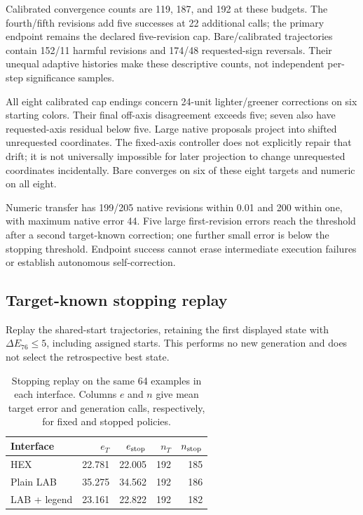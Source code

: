 Calibrated convergence counts are 119, 187, and 192 at these budgets.
The fourth/fifth revisions add five successes at 22 additional calls;
the primary endpoint remains the declared five-revision cap.
Bare/calibrated trajectories contain 152/11 harmful revisions and 174/48
requested-sign reversals. Their unequal adaptive histories make these
descriptive counts, not independent per-step significance samples.

All eight calibrated cap endings concern 24-unit lighter/greener corrections
on six starting colors. Their final off-axis disagreement exceeds five;
seven also have requested-axis residual below five. Large native proposals
project into shifted unrequested coordinates. The fixed-axis controller
does not explicitly repair that drift; it is not universally impossible
for later projection to change unrequested coordinates incidentally.
Bare converges on six of these eight targets and numeric on all eight.

Numeric transfer has 199/205 native revisions within 0.01 and 200 within one,
with maximum native error 44. Five large first-revision errors reach the
threshold after a second target-known correction; one further small error
is below the stopping threshold. Endpoint success cannot erase intermediate
execution failures or establish autonomous self-correction.

\subsection{Target-known stopping replay}
\label{app:stopping}
Replay the shared-start trajectories, retaining the first displayed state
with $\Delta E_{76}\leq5$, including assigned starts. This performs no
new generation and does not select the retrospective best state.

\begin{table}[H]
\centering\small
\begin{tabular}{@{}lrrrr@{}}
\toprule
Interface & $e_T$ & $e_{\rm stop}$ & $n_T$ & $n_{\rm stop}$ \\
\midrule
HEX & 22.781 & 22.005 & 192 & 185 \\
Plain LAB & 35.275 & 34.562 & 192 & 186 \\
LAB + legend & 23.161 & 22.822 & 192 & 182 \\
\bottomrule
\end{tabular}
\caption{Stopping replay on the same 64 examples in each interface.
Columns $e$ and $n$ give mean target error and generation calls,
respectively, for fixed and stopped policies.}
\end{table}

